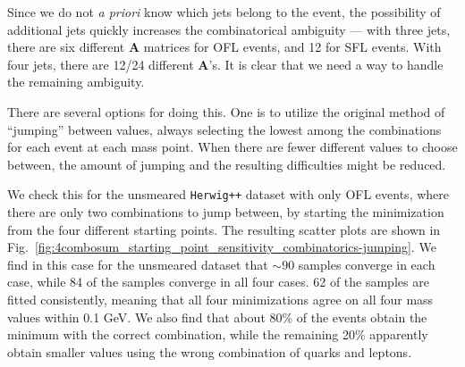 \documentclass[twoside,english]{uiofysmaster}
\begin{document}
Since we do not {\it a priori} know which jets belong to the event, the possibility of additional jets quickly increases the combinatorical ambiguity --- with three jets, there are six different $\mathbf{A}$ matrices for OFL events, and 12 for SFL events. With four jets, there are 12/24 different $\mathbf{A}$'s. It is clear that we need a way to handle the remaining ambiguity. 

There are several options for doing this. One is to utilize the original method of ``jumping'' between values, always selecting the lowest  among the combinations for each event at each mass point. When there are fewer different values to choose between, the amount of jumping and the resulting difficulties might be reduced. 

We check this for the unsmeared {\tt Herwig++} dataset with only OFL events, where there are only two combinations to jump between, by starting the minimization from the four different starting points. The resulting scatter plots are shown in Fig.\ \ref{fig:4combosum_starting_point_sensitivity_combinatorics-jumping}. We find in this case for the unsmeared dataset that $\sim 90$ samples converge in each case, while 84 of the samples converge in all four cases. 62 of the samples are fitted consistently, meaning that all four minimizations agree on all four mass values within 0.1 GeV. We also find that about 80\% of the events obtain the minimum with the correct combination, while the remaining 20\% apparently obtain smaller values using the wrong combination of quarks and leptons.
\end{document}
